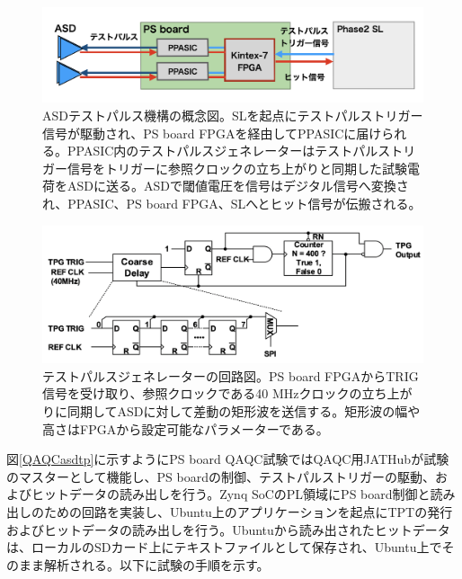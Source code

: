 \begin{figure} 
\centering
\includegraphics[width=16cm]{fig/QAQC/PSBasdtp.png}
\caption[ASDテストパルスの概念図]{ASDテストパルス機構の概念図。SLを起点にテストパルストリガー信号が駆動され、PS board FPGAを経由してPPASICに届けられる。PPASIC内のテストパルスジェネレーターはテストパルストリガー信号をトリガーに参照クロックの立ち上がりと同期した試験電荷をASDに送る。ASDで閾値電圧を信号はデジタル信号へ変換され、PPASIC、PS board FPGA、SLへとヒット信号が伝搬される。}
\label{PSBasdtp}
\end{figure}

\begin{figure} 
    \centering
    \includegraphics[width=16cm]{fig/QAQC/PSBtpg.png}
    \caption[テストパルスジェネレーターの回路図]{テストパルスジェネレーターの回路図。PS board FPGAからTRIG信号を受け取り、参照クロックである40 MHzクロックの立ち上がりに同期してASDに対して差動の矩形波を送信する。矩形波の幅や高さはFPGAから設定可能なパラメーターである。}
    \label{PSBtpg}
\end{figure}

図\ref{QAQCasdtp}に示すようにPS board QAQC試験ではQAQC用JATHubが試験のマスターとして機能し、PS boardの制御、テストパルストリガーの駆動、およびヒットデータの読み出しを行う。Zynq SoCのPL領域にPS board制御と読み出しのための回路を実装し、Ubuntu上のアプリケーションを起点にTPTの発行およびヒットデータの読み出しを行う。Ubuntuから読み出されたヒットデータは、ローカルのSDカード上にテキストファイルとして保存され、Ubuntu上でそのまま解析される。以下に試験の手順を示す。


